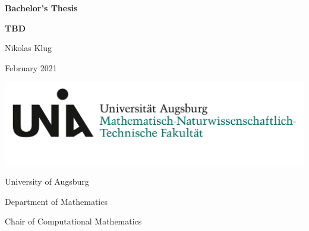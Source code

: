 \begin{titlepage}
	\centering
	
	\large{\textbf{Bachelor's Thesis}}
	\vspace{0.4cm}
	
	\huge{\textbf{TBD}}\par
	
	\vspace{1cm}
	\Large{Nikolas Klug}
	
	\vspace{1cm}
	\Large{February 2021}
	
	\vspace{\fill}
	\includegraphics[scale=0.5]{figures/Uni_Aug_Logo_MNTF_RGB.png}
	\vspace{5mm}
	
	University of Augsburg
	
	Department of Mathematics
	
	Chair of Computational Mathematics
\end{titlepage}

\normalfont
\restoregeometry
\pagebreak

